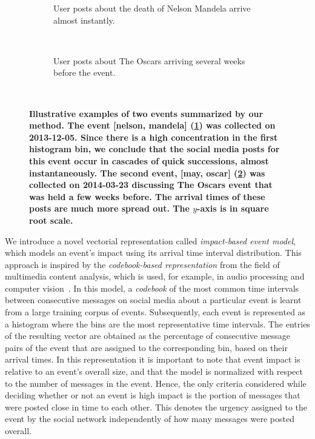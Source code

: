 \documentclass[10pt,letterpaper]{article}
\newcommand{\newtext}[1]{{\leavevmode\color{blue}#1}}
\begin{document}
\begin{figure}
  \centering
  \begin{subfigure}{\textwidth}
    \caption{User posts about the death of Nelson Mandela arrive
      almost instantly.}
    \label{fig:nelson_mandela}
  \end{subfigure}%

  ~ %
  \begin{subfigure}{\textwidth}
    \caption{User posts about The Oscars arriving several weeks before
      the event.}
    \label{fig:oscars}
  \end{subfigure}%
  ~ %

  \caption{\textbf{Illustrative examples of two events
      summarized by our method. The event [nelson, mandela] (\ref{fig:nelson_mandela}) was
      collected on 2013-12-05. Since there is a high
      concentration in the first histogram bin, we conclude that the social media posts
      for this event occur in cascades of quick successions, almost
      instantaneously. The second event, [may, oscar] (\ref{fig:oscars}) was collected
      on 2014-03-23 discussing The Oscars event that was held a few
      weeks before. The arrival times of these posts are much more spread
      out. The $y$-axis is in square root scale.} 
  }
  \label{fig:example_buzz}
\end{figure}

We introduce a novel vectorial representation called {\em
    impact-based event model}, which models an event's impact using
  its arrival time interval distribution.  This approach is inspired
  by the {\em codebook-based representation} from the field of
  multimedia content analysis, which is used, for example, in audio
  processing and computer vision~\cite{ff,Vaizman}.  In this model, a
  \emph{codebook} of the most common time intervals between
  consecutive messages on social media about a particular event is
  learnt from a large training corpus of events.  Subsequently, each
  event is represented as a histogram where the bins are the most
  representative time intervals.  The entries of the resulting vector
  are obtained as the percentage of consecutive message pairs of the
  event that are assigned to the corresponding bin, based on their
  arrival times.  In this representation it is important to note that
  event impact is relative to an event's overall size, and that the
  model is normalized with respect to the number of messages in the
  event. Hence, the only criteria considered while deciding whether or
  not an event is high impact is the portion of messages that were
  posted close in time to each other. This denotes the urgency
  assigned to the event by the social network independently of how
  many messages were posted overall.  %
\end{document}
